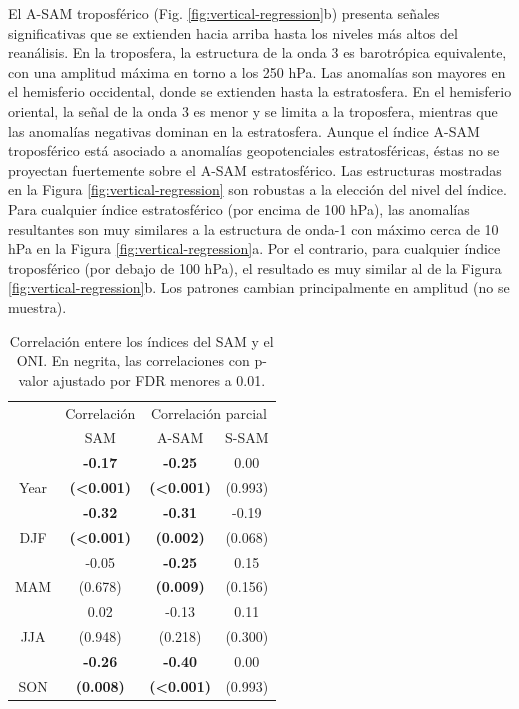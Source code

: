 \documentclass[12pt,oneside]{reedthesis}
\begin{document}
El A-SAM troposférico (Fig. \ref{fig:vertical-regression}b) presenta señales significativas que se extienden hacia arriba hasta los niveles más altos del reanálisis.
En la troposfera, la estructura de la onda 3 es barotrópica equivalente, con una amplitud máxima en torno a los 250 hPa.
Las anomalías son mayores en el hemisferio occidental, donde se extienden hasta la estratosfera.
En el hemisferio oriental, la señal de la onda 3 es menor y se limita a la troposfera, mientras que las anomalías negativas dominan en la estratosfera.
Aunque el índice A-SAM troposférico está asociado a anomalías geopotenciales estratosféricas, éstas no se proyectan fuertemente sobre el A-SAM estratosférico.
Las estructuras mostradas en la Figura \ref{fig:vertical-regression} son robustas a la elección del nivel del índice.
Para cualquier índice estratosférico (por encima de 100 hPa), las anomalías resultantes son muy similares a la estructura de onda-1 con máximo cerca de 10 hPa en la Figura \ref{fig:vertical-regression}a.
Por el contrario, para cualquier índice troposférico (por debajo de 100 hPa), el resultado es muy similar al de la Figura \ref{fig:vertical-regression}b.
Los patrones cambian principalmente en amplitud (no se muestra).



\begin{table}

\caption{\label{tab:enso-cor-table}Correlación entere los índices del SAM y el ONI. En negrita, las correlaciones con p-valor ajustado por FDR menores a 0.01.}
\centering
\begin{tabular}[t]{c>{}c>{}c>{}c}
\toprule
\multicolumn{1}{c}{ } & \multicolumn{1}{c}{Correlación} & \multicolumn{2}{c}{Correlación parcial} \\
\cmidrule(l{3pt}r{3pt}){2-2} \cmidrule(l{3pt}r{3pt}){3-4}
 & SAM & A-SAM & S-SAM\\
\midrule
 & \textbf{-0.17} & \textbf{-0.25} & 0.00\\
\cmidrule{2-4}
\multirow[t]{-2}{*}{\centering\arraybackslash Year} & \textbf{(<0.001)} & \textbf{(<0.001)} & (0.993)\\
\cmidrule{1-4}
 & \textbf{-0.32} & \textbf{-0.31} & -0.19\\
\cmidrule{2-4}
\multirow[t]{-2}{*}{\centering\arraybackslash DJF} & \textbf{(<0.001)} & \textbf{(0.002)} & (0.068)\\
\cmidrule{1-4}
 & -0.05 & \textbf{-0.25} & 0.15\\
\cmidrule{2-4}
\multirow[t]{-2}{*}{\centering\arraybackslash MAM} & (0.678) & \textbf{(0.009)} & (0.156)\\
\cmidrule{1-4}
 & 0.02 & -0.13 & 0.11\\
\cmidrule{2-4}
\multirow[t]{-2}{*}{\centering\arraybackslash JJA} & (0.948) & (0.218) & (0.300)\\
\cmidrule{1-4}
 & \textbf{-0.26} & \textbf{-0.40} & 0.00\\
\cmidrule{2-4}
\multirow[t]{-2}{*}{\centering\arraybackslash SON} & \textbf{(0.008)} & \textbf{(<0.001)} & (0.993)\\
\bottomrule
\end{tabular}
\end{table}
\end{document}
